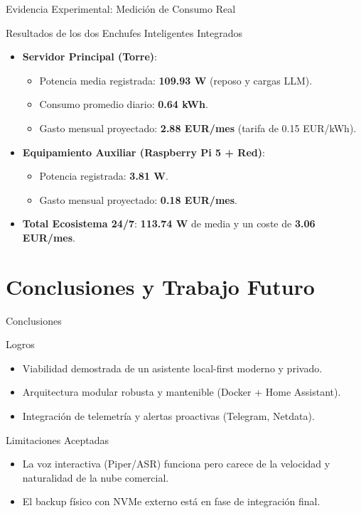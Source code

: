 \documentclass[11pt]{beamer}
\begin{document}
\begin{frame}{Evidencia Experimental: Medición de Consumo Real}
  \begin{block}{Resultados de los dos Enchufes Inteligentes Integrados}
    \begin{itemize}
      \item \textbf{Servidor Principal (Torre)}:
        \begin{itemize}
          \item Potencia media registrada: \textbf{109.93 W} (reposo y cargas LLM).
          \item Consumo promedio diario: \textbf{0.64 kWh}.
          \item Gasto mensual proyectado: \textbf{2.88 EUR/mes} (tarifa de 0.15 EUR/kWh).
        \end{itemize}
      \item \textbf{Equipamiento Auxiliar (Raspberry Pi 5 + Red)}:
        \begin{itemize}
          \item Potencia registrada: \textbf{3.81 W}.
          \item Gasto mensual proyectado: \textbf{0.18 EUR/mes}.
        \end{itemize}
      \item \textbf{Total Ecosistema 24/7}: \textbf{113.74 W} de media y un coste de \textbf{3.06 EUR/mes}.
    \end{itemize}
  \end{block}
\end{frame}

\section{Conclusiones y Trabajo Futuro}

\begin{frame}{Conclusiones}
  \begin{block}{Logros}
    \begin{itemize}
      \item Viabilidad demostrada de un asistente local-first moderno y privado.
      \item Arquitectura modular robusta y mantenible (Docker + Home Assistant).
      \item Integración de telemetría y alertas proactivas (Telegram, Netdata).
    \end{itemize}
  \end{block}
  \begin{block}{Limitaciones Aceptadas}
    \begin{itemize}
      \item La voz interactiva (Piper/ASR) funciona pero carece de la velocidad y naturalidad de la nube comercial.
      \item El backup físico con NVMe externo está en fase de integración final.
    \end{itemize}
  \end{block}
\end{frame}
\end{document}

